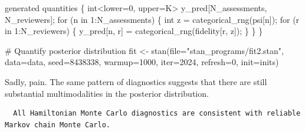 \documentclass[
  letterpaper,
  DIV=11,
  numbers=noendperiod]{scrartcl}
\newenvironment{Shaded}{\begin{snugshade}}{\end{snugshade}}
\newcommand{\AttributeTok}[1]{\textcolor[rgb]{0.40,0.45,0.13}{#1}}
\newcommand{\CommentTok}[1]{\textcolor[rgb]{0.37,0.37,0.37}{#1}}
\newcommand{\ControlFlowTok}[1]{\textcolor[rgb]{0.00,0.23,0.31}{#1}}
\newcommand{\DataTypeTok}[1]{\textcolor[rgb]{0.68,0.00,0.00}{#1}}
\newcommand{\DecValTok}[1]{\textcolor[rgb]{0.68,0.00,0.00}{#1}}
\newcommand{\FunctionTok}[1]{\textcolor[rgb]{0.28,0.35,0.67}{#1}}
\newcommand{\KeywordTok}[1]{\textcolor[rgb]{0.00,0.23,0.31}{#1}}
\newcommand{\NormalTok}[1]{\textcolor[rgb]{0.00,0.23,0.31}{#1}}
\newcommand{\OtherTok}[1]{\textcolor[rgb]{0.00,0.23,0.31}{#1}}
\newcommand{\SpecialCharTok}[1]{\textcolor[rgb]{0.37,0.37,0.37}{#1}}
\newcommand{\StringTok}[1]{\textcolor[rgb]{0.13,0.47,0.30}{#1}}
\begin{document}
\begin{codelisting}
\begin{Shaded}
\begin{Highlighting}[]
\KeywordTok{generated quantities}\NormalTok{ \{}
  \DataTypeTok{int}\NormalTok{\textless{}}\KeywordTok{lower}\NormalTok{=}\DecValTok{0}\NormalTok{, }\KeywordTok{upper}\NormalTok{=K\textgreater{} y\_pred[N\_assessments, N\_reviewers];}
  \ControlFlowTok{for}\NormalTok{ (n }\ControlFlowTok{in} \DecValTok{1}\NormalTok{:N\_assessments) \{}
    \DataTypeTok{int}\NormalTok{ z = categorical\_rng(psi[n]);}
    \ControlFlowTok{for}\NormalTok{ (r }\ControlFlowTok{in} \DecValTok{1}\NormalTok{:N\_reviewers) \{}
\NormalTok{      y\_pred[n, r] = categorical\_rng(fidelity[r, z]);}
\NormalTok{    \}}
\NormalTok{  \}}
\NormalTok{\}}
\end{Highlighting}
\end{Shaded}

\end{codelisting}

\begin{Shaded}
\begin{Highlighting}[]
\CommentTok{\# Quantify posterior distribution}
\NormalTok{fit }\OtherTok{\textless{}{-}} \FunctionTok{stan}\NormalTok{(}\AttributeTok{file=}\StringTok{"stan\_programs/fit2.stan"}\NormalTok{,}
            \AttributeTok{data=}\NormalTok{data, }\AttributeTok{seed=}\DecValTok{8438338}\NormalTok{,}
            \AttributeTok{warmup=}\DecValTok{1000}\NormalTok{, }\AttributeTok{iter=}\DecValTok{2024}\NormalTok{, }\AttributeTok{refresh=}\DecValTok{0}\NormalTok{,}
            \AttributeTok{init=}\NormalTok{inits)}
\end{Highlighting}
\end{Shaded}

Sadly, pain. The same pattern of diagnostics suggests that there are
still substantial multimodalities in the posterior distribution.

\begin{Shaded}
\end{Shaded}

\begin{verbatim}
  All Hamiltonian Monte Carlo diagnostics are consistent with reliable
Markov chain Monte Carlo.
\end{verbatim}
\end{document}
